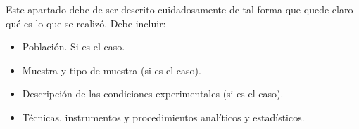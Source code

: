 Este apartado debe de ser descrito cuidadosamente de tal forma que quede claro qué es lo que se realizó.
Debe incluir:
\begin{itemize}
    \item Población. Si es el caso.
    \item Muestra y tipo de muestra (si es el caso).
    \item Descripción de las condiciones experimentales (si es el caso).
    \item Técnicas, instrumentos y procedimientos analíticos y estadísticos.
\end{itemize}
